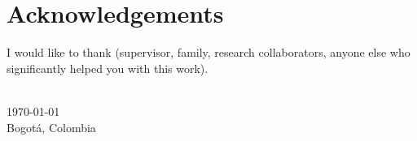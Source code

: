 \chapter*{Acknowledgements}

I would like to thank (supervisor, family, research collaborators, anyone else who significantly helped you with this work).

{
\makeatletter
\vspace{1cm}
\raggedleft
\@author{}\\
\today{}\\
Bogotá, Colombia\\
\raggedright
\makeatother
}
